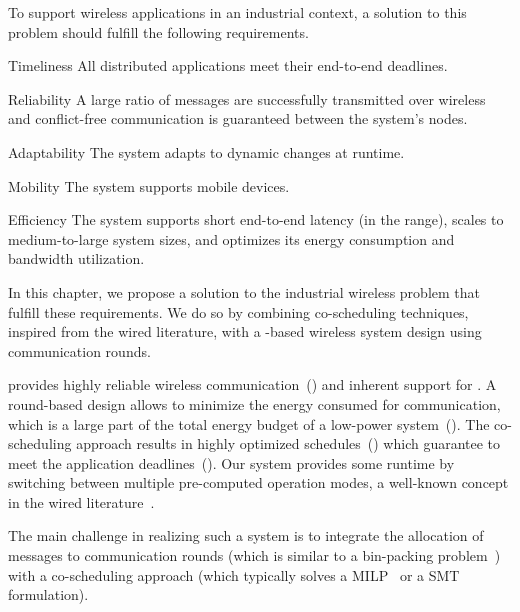 To support wireless \CPS applications in an industrial context, a solution to this problem should fulfill the following requirements.
\begin{features}[labelwidth=65pt, leftmargin=(\labelwidth+\labelsep)]

  \item[Timeliness]
  All distributed applications meet their end-to-end deadlines.

  \item[Reliability]
  A large ratio of messages are successfully transmitted over wireless and conflict-free communication is guaranteed between the system's nodes.

  \item[Adaptability]
  The system adapts to dynamic changes at runtime.

  \item[Mobility]
  The system supports mobile devices.

  \item[Efficiency]
  The system
  supports short end-to-end latency (in the \ms range),
  scales to medium-to-large system sizes,
  and
  optimizes its energy consumption and bandwidth utilization.

\end{features}

In this chapter, we propose a solution to the industrial wireless \CPS problem that fulfill these requirements.
We do so by combining co-scheduling techniques, inspired from the wired literature, with a \ST-based wireless system design using communication rounds.

\ST provides highly reliable wireless communication~() and inherent support for .
A round-based design allows to minimize the energy consumed for communication, which is a large part of the total energy budget of a low-power system~().
The co-scheduling approach results in highly optimized schedules~() which guarantee to meet the application deadlines~().
Our system provides some runtime  by switching between multiple pre-computed operation modes, a well-known concept in the wired literature~\cite{fohler1993changing}.

The main challenge in realizing such a system is to integrate the allocation of messages to communication rounds (which is similar to a bin-packing problem~\cite{wikipedia2019BinPacking}) with a co-scheduling approach (which typically solves a MILP~\cite{azim2014Scheduling} or a SMT~\cite{steiner2010evaluation,craciunas2014SMTbased,huang2012Static} formulation).

